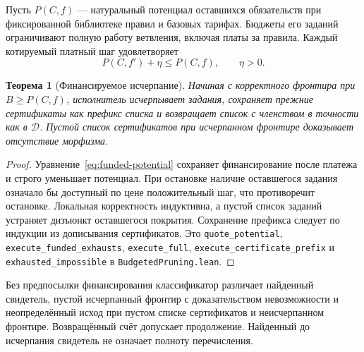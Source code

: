 \documentclass[10pt,a4paper]{article}
\newtheorem{theorem}{Теорема}[section]
\newcommand{\CanonRef}{\mathcal D}
\newcommand{\rc}[1]{\allowbreak\texttt{#1}\allowbreak}
\begin{document}
Пусть $P(C,f)$ --- натуральный потенциал оставшихся обязательств при фиксированной библиотеке правил и базовых тарифах. Бюджеты его заданий ограничивают полную работу ветвления, включая платы за правила. Каждый котируемый платный шаг удовлетворяет
\begin{equation}\label{eq:funded-potential}
 P(C,f')+\eta\le P(C,f),\qquad\eta>0.
\end{equation}
\begin{theorem}[Финансируемое исчерпание]\label{thm:funded-search}
Начиная с корректного фронтира при $B\ge P(C,f)$, исполнитель исчерпывает задания, сохраняет прежние сертификаты как префикс списка и возвращает список с членством в точности как в $\CanonRef$. Пустой список сертификатов при исчерпанном фронтире доказывает отсутствие морфизма.
\end{theorem}
\begin{proof}
Уравнение~\eqref{eq:funded-potential} сохраняет финансирование после платежа и строго уменьшает потенциал. При остановке наличие оставшегося задания означало бы доступный по цене положительный шаг, что противоречит остановке. Локальная корректность индуктивна, а пустой список заданий устраняет дизъюнкт оставшегося покрытия. Сохранение префикса следует по индукции из дописывания сертификатов. Это \rc{quote\_potential}, \rc{execute\_funded\_exhausts}, \rc{execute\_full}, \rc{execute\_certificate\_prefix} и \rc{exhausted\_impossible} в \rc{BudgetedPruning.lean}.
\end{proof}
Без предпосылки финансирования классификатор различает найденный свидетель, пустой исчерпанный фронтир с доказательством невозможности и неопределённый исход при пустом списке сертификатов и неисчерпанном фронтире. Возвращённый счёт допускает продолжение. Найденный до исчерпания свидетель не означает полноту перечисления.
\end{document}
